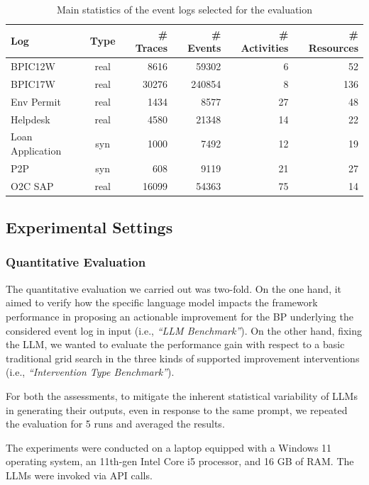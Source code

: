 \documentclass[preprint,12pt]{elsarticle}
\begin{document}
\begin{table}[htbp]
\caption{Main statistics of the event logs selected for the evaluation}
\label{tbl:log_properties}
\begin{tabular*}{\tblwidth}{@{} L C R R R R @{}}
\toprule
\textbf{Log} & \textbf{Type} & \textbf{\# Traces} & \textbf{\# Events} & \textbf{\# Activities} & \textbf{\# Resources} \\ 
\midrule
BPIC12W & real & 8616 & 59302 & 6 & 52 \\
BPIC17W & real & 30276 & 240854 & 8 & 136 \\
Env Permit & real & 1434 & 8577 & 27 & 48 \\
Helpdesk & real & 4580 & 21348 & 14 & 22 \\
Loan Application & syn & 1000 & 7492 & 12 & 19 \\
P2P & syn & 608 & 9119 & 21 & 27 \\
O2C SAP & real & 16099 & 54363 & 75 & 14 \\
\bottomrule
\end{tabular*}
\end{table}

\subsection{Experimental Settings}
\label{sec:settings}

\subsubsection{Quantitative Evaluation}
\label{sec:quantitative_setup}
The quantitative evaluation we carried out was two-fold. On the one hand, it aimed to verify how the specific language model impacts the framework performance in proposing an actionable improvement for the BP underlying the considered event log in input (i.e., \textit{``LLM Benchmark''}). On the other hand, fixing the LLM, we wanted to evaluate the performance gain with respect to a basic traditional grid search in the three kinds of supported improvement interventions (i.e., \textit{``Intervention Type Benchmark''}).

For both the assessments, to mitigate the inherent statistical variability of LLMs in generating their outputs, even in response to the same prompt, we repeated the evaluation for 5 runs and averaged the results.

The experiments were conducted on a laptop equipped with a Windows 11 operating system, an 11th-gen Intel Core i5 processor, and 16 GB of RAM. The LLMs were invoked via API calls.
\end{document}
